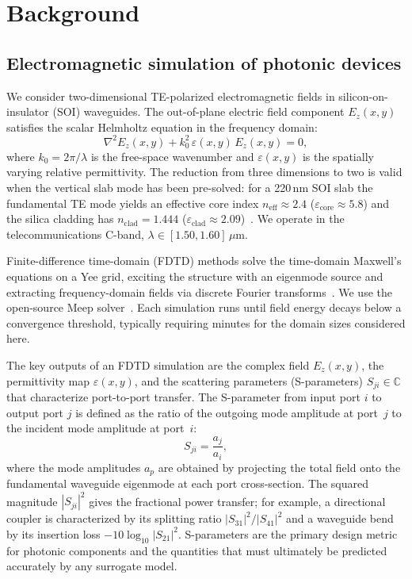 \section{\label{sec:background}Background}

\subsection{Electromagnetic simulation of photonic devices}

We consider two-dimensional TE-polarized electromagnetic fields in silicon-on-insulator (SOI) waveguides.
The out-of-plane electric field component $E_z(x,y)$ satisfies the scalar Helmholtz equation in the frequency domain:
\begin{equation}
    \nabla^2 E_z(x,y) + k_0^2 \,\varepsilon(x,y)\, E_z(x,y) = 0,
    \label{eq:helmholtz}
\end{equation}
where $k_0 = 2\pi/\lambda$ is the free-space wavenumber and $\varepsilon(x,y)$ is the spatially varying relative
permittivity. The reduction from three dimensions to two is valid when the vertical slab mode has been pre-solved: for
a 220\,nm SOI slab the fundamental TE mode yields an effective core index $n_\text{eff}\approx 2.4$
($\varepsilon_\text{core}\approx 5.8$) and the silica cladding has $n_\text{clad}=1.444$
($\varepsilon_\text{clad}\approx 2.09$)~\cite{Reed2004SiliconPhotonics}. We operate in the telecommunications C-band,
$\lambda\in[1.50,1.60]\,\mu$m.

Finite-difference time-domain (FDTD) methods solve the time-domain Maxwell's equations on a Yee grid, exciting the
structure with an eigenmode source and extracting frequency-domain fields via discrete Fourier
transforms~\cite{TafloveHagness2005FDTD}. We use the open-source Meep solver~\cite{Oskooi2010Meep}. Each simulation runs until field energy decays below a convergence
threshold, typically requiring minutes for the domain sizes considered here.

The key outputs of an FDTD simulation are the complex field $E_z(x,y)$, the permittivity map $\varepsilon(x,y)$, and
the scattering parameters (S-parameters) $S_{ji}\in\mathbb{C}$ that characterize port-to-port transfer. The
S-parameter from input port $i$ to output port $j$ is defined as the ratio of the outgoing mode amplitude at port~$j$
to the incident mode amplitude at port~$i$:
\begin{equation}
    S_{ji} = \frac{a_j}{a_i},
    \label{eq:sparam_def}
\end{equation}
where the mode amplitudes $a_p$ are obtained by projecting the total field onto the fundamental waveguide eigenmode at
each port cross-section. The squared magnitude $|S_{ji}|^2$ gives the fractional power transfer; for example, a
directional coupler is characterized by its splitting ratio $|S_{31}|^2/|S_{41}|^2$ and a waveguide bend by its
insertion loss $-10\log_{10}|S_{21}|^2$.  S-parameters are the primary design metric for photonic components and the
quantities that must ultimately be predicted accurately by any surrogate model.

